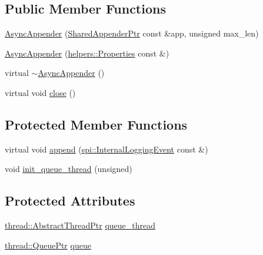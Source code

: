 \subsection*{Public Member Functions}
\begin{DoxyCompactItemize}
\item 
\hyperlink{classlog4cplus_1_1AsyncAppender_ad81e7ab26af2d1d15eda02ae6c2b41d8}{Async\-Appender} (\hyperlink{namespacelog4cplus_a12d841b842c72396be9219ce67a0c215}{Shared\-Appender\-Ptr} const \&app, unsigned max\-\_\-len)
\item 
\hyperlink{classlog4cplus_1_1AsyncAppender_a18762b77d8e41f78bb132321ebbfbc17}{Async\-Appender} (\hyperlink{classlog4cplus_1_1helpers_1_1Properties}{helpers\-::\-Properties} const \&)
\item 
virtual \hyperlink{classlog4cplus_1_1AsyncAppender_a5914577fc6d4b982ab2f1cdd7e5faeb5}{$\sim$\-Async\-Appender} ()
\item 
virtual void \hyperlink{classlog4cplus_1_1AsyncAppender_a86a7ea43e6579ed609e92cf0b591127f}{close} ()
\end{DoxyCompactItemize}
\subsection*{Protected Member Functions}
\begin{DoxyCompactItemize}
\item 
virtual void \hyperlink{classlog4cplus_1_1AsyncAppender_a81fad3811c666ebeb729db74474a3366}{append} (\hyperlink{classlog4cplus_1_1spi_1_1InternalLoggingEvent}{spi\-::\-Internal\-Logging\-Event} const \&)
\item 
void \hyperlink{classlog4cplus_1_1AsyncAppender_a374ac77acbb5c311dbf5f054d8a977fc}{init\-\_\-queue\-\_\-thread} (unsigned)
\end{DoxyCompactItemize}
\subsection*{Protected Attributes}
\begin{DoxyCompactItemize}
\item 
\hyperlink{namespacelog4cplus_1_1thread_a06509aec895c736c1e3b0736dc8183fb}{thread\-::\-Abstract\-Thread\-Ptr} \hyperlink{classlog4cplus_1_1AsyncAppender_a04d50d9a0ba4584a5fc9dee9e3f0259a}{queue\-\_\-thread}
\item 
\hyperlink{namespacelog4cplus_1_1thread_a068fb33b4473fbc7d642ce6ea5a54b7d}{thread\-::\-Queue\-Ptr} \hyperlink{classlog4cplus_1_1AsyncAppender_a0564c00edb9cde05fb34d5d541d50335}{queue}
\end{DoxyCompactItemize}

